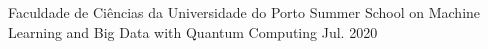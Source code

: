 \cventry
{
  Faculdade de Ciências da Universidade do Porto
}
{
  Summer School on Machine Learning and Big Data with Quantum Computing
}
{}
{
    Jul. 2020
}
{}
